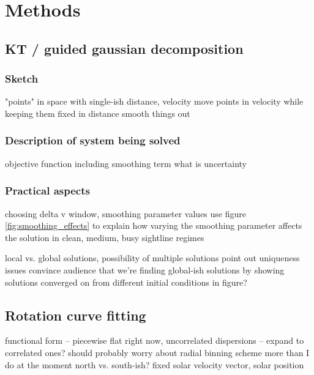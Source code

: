 \section{Methods}
\label{sec:methods}
\subsection{KT / guided gaussian decomposition}

\subsubsection{Sketch}
"points" in space with single-ish distance, velocity
move points in velocity while keeping them fixed in distance
smooth things out

\subsubsection{Description of system being solved}
objective function including smoothing term
what is uncertainty

\subsubsection{Practical aspects}
choosing delta v window, smoothing parameter values
use figure \ref{fig:smoothing_effects} to explain how varying the smoothing parameter affects the solution in clean, medium, busy sightline regimes

local vs. global solutions, possibility of multiple solutions
point out uniqueness issues
convince audience that we're finding global-ish solutions by showing solutions converged on from different initial conditions in figure?

\subsection{Rotation curve fitting}
functional form -- piecewise flat 
right now, uncorrelated dispersions -- expand to correlated ones?
should probably worry about radial binning scheme more than I do at the moment
north vs. south-ish?
fixed solar velocity vector, solar position
